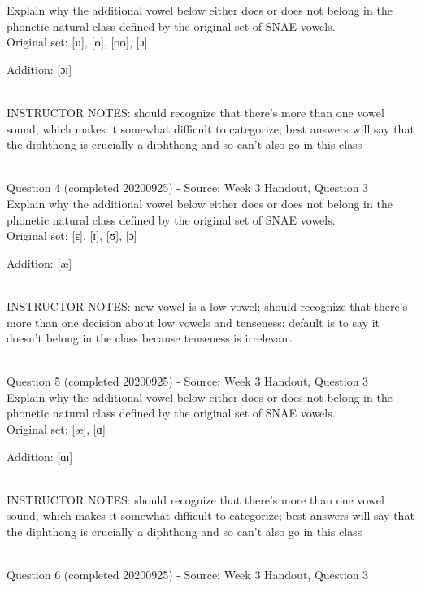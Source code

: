 \documentclass[12pt]{article}
\begin{document}
Explain why the additional vowel below either does or does not belong in the phonetic natural class defined by the original set of SNAE vowels.\\

Original set: {[u]}, {[ʊ]}, {[oʊ]}, {[ɔ]}

Addition: {[ɔɪ]}


~\\
INSTRUCTOR NOTES: should recognize that there's more than one vowel sound, which makes it somewhat difficult to categorize; best answers will say that the diphthong is crucially a diphthong and so can't also go in this class


~\\

{\large Question 4} (completed 20200925) - Source: Week 3 Handout, Question 3\\

Explain why the additional vowel below either does or does not belong in the phonetic natural class defined by the original set of SNAE vowels.\\

Original set: {[ɛ]}, {[ɪ]}, {[ʊ]}, {[ɔ]}

Addition: {[æ]}


~\\
INSTRUCTOR NOTES: new vowel is a low vowel; should recognize that there's more than one decision about low vowels and tenseness; default is to say it doesn't belong in the class because tenseness is irrelevant


~\\

{\large Question 5} (completed 20200925) - Source: Week 3 Handout, Question 3\\

Explain why the additional vowel below either does or does not belong in the phonetic natural class defined by the original set of SNAE vowels.\\

Original set: {[æ]}, {[ɑ]}

Addition: {[ɑɪ]}


~\\
INSTRUCTOR NOTES: should recognize that there's more than one vowel sound, which makes it somewhat difficult to categorize; best answers will say that the diphthong is crucially a diphthong and so can't also go in this class


~\\

{\large Question 6} (completed 20200925) - Source: Week 3 Handout, Question 3\\
\end{document}
